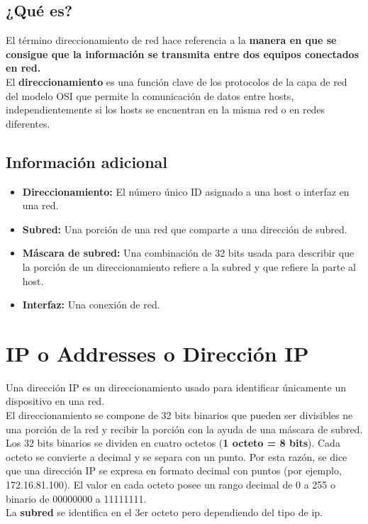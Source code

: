 \documentclass[letterpaper,12pt]{article}
\begin{document}
\begin{sloppypar}
\subsection{¿Qué es?}
El término direccionamiento de red hace referencia a la \textbf{manera en que se consigue que la información se transmita entre dos equipos conectados en red.}
\vspace{0.3cm}\\ 
El \textbf{direccionamiento} es una función clave de los protocolos de la capa de red del modelo OSI que permite la comunicación de datos entre hosts, independientemente si los hosts se encuentran en la misma red o en redes diferentes. 

\subsection{Información adicional}
\begin{itemize}
    \item \textbf{Direccionamiento:} El número único ID asignado a una host o interfaz en una red. 
    \item \textbf{Subred:} Una porción de una red que comparte a una dirección de subred. 
    \item \textbf{Máscara de subred:} Una combinación de 32 bits usada para describir que la porción de un direccionamiento refiere a la subred y que refiere la parte al host.
    \item \textbf{Interfaz:} Una conexión de red.
\end{itemize}

\section{IP o Addresses o Dirección IP}
Una dirección IP es un direccionamiento usado para identificar únicamente un dispositivo en una red. 
\vspace{0.3cm}\\
El direccionamiento se compone de 32 bits binarios que pueden ser divisibles ne una porción de la red y recibir la porción con la ayuda de una máscara de subred. Los 32 bits binarios se dividen en cuatro octetos (\textbf{1 octeto = 8 bits}). Cada octeto se convierte a decimal y se separa con un punto. Por esta razón, se dice que una dirección IP se expresa en formato decimal con puntos (por ejemplo, 172.16.81.100). El valor en cada octeto posee un rango decimal de 0 a 255 o binario de 00000000 a 11111111.
\vspace{0.3cm}\\
La \textbf{subred} se identifica en el 3er octeto pero dependiendo del tipo de ip.


\end{sloppypar}
\end{document}
